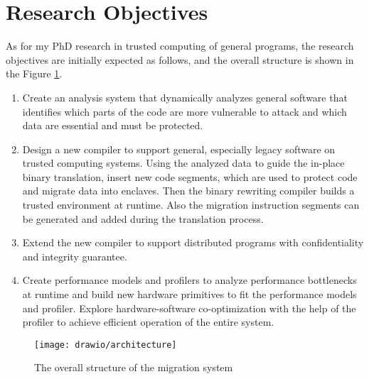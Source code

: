 \section{Research Objectives}
As for my PhD research in trusted computing of general programs, the research
objectives are initially expected as follows, and the overall structure is
shown in the Figure \ref{fig:arch}.
\begin{enumerate}[(1)]
    \item Create an analysis system that dynamically analyzes general software
    that identifies which parts of the code are more vulnerable to attack and
    which data are essential and must be protected.
    \item Design a new compiler to support general, especially legacy
    software on trusted computing systems.    
    Using the analyzed data to guide the in-place binary translation,
    insert new code segments, which are used to protect code and migrate data into enclaves.
    Then the binary rewriting compiler builds a trusted environment at runtime.
    Also the migration instruction segments can be generated and added during the translation process.
    \item Extend the new compiler to support distributed programs with confidentiality and integrity guarantee.
    \item Create performance models and profilers to analyze performance bottlenecks at runtime
    and build new hardware primitives to fit the performance models and profiler.
    Explore hardware-software co-optimization with the help of the profiler to
    achieve efficient operation of the entire system.
\end{enumerate}

\begin{figure}
    \centering
    \texttt{[image: drawio/architecture]}
    \caption{The overall structure of the migration system}
    \label{fig:arch}
\end{figure}